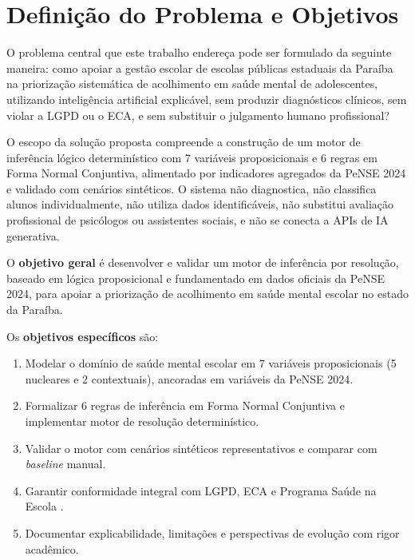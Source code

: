 \documentclass[
    12pt,
    openright,
    oneside,
    a4paper,
    english,
    brazil
]{abntex2}
\begin{document}
\chapter{Definição do Problema e Objetivos}

O problema central que este trabalho endereça pode ser formulado da seguinte maneira: como apoiar a gestão escolar de escolas públicas estaduais da Paraíba na priorização sistemática de acolhimento em saúde mental de adolescentes, utilizando inteligência artificial explicável, sem produzir diagnósticos clínicos, sem violar a LGPD ou o ECA, e sem substituir o julgamento humano profissional?

O escopo da solução proposta compreende a construção de um motor de inferência lógico determinístico com 7 variáveis proposicionais e 6 regras em Forma Normal Conjuntiva, alimentado por indicadores agregados da PeNSE 2024 e validado com cenários sintéticos. O sistema não diagnostica, não classifica alunos individualmente, não utiliza dados identificáveis, não substitui avaliação profissional de psicólogos ou assistentes sociais, e não se conecta a APIs de IA generativa.

O \textbf{objetivo geral} é desenvolver e validar um motor de inferência por resolução, baseado em lógica proposicional e fundamentado em dados oficiais da PeNSE 2024, para apoiar a priorização de acolhimento em saúde mental escolar no estado da Paraíba.

Os \textbf{objetivos específicos} são:

\begin{enumerate}
    \item Modelar o domínio de saúde mental escolar em 7 variáveis proposicionais (5 nucleares e 2 contextuais), ancoradas em variáveis da PeNSE 2024.
    \item Formalizar 6 regras de inferência em Forma Normal Conjuntiva e implementar motor de resolução determinístico.
    \item Validar o motor com cenários sintéticos representativos e comparar com \textit{baseline} manual.
    \item Garantir conformidade integral com LGPD, ECA e Programa Saúde na Escola \cite{brasil_pse_2007}.
    \item Documentar explicabilidade, limitações e perspectivas de evolução com rigor acadêmico.
\end{enumerate}
\end{document}
